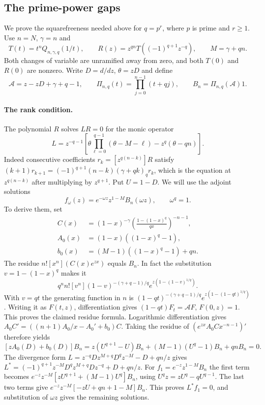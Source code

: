 \subsection{The prime-power gaps}

We prove the squarefreeness needed above for \(q=p^r\),
where \(p\) is prime and \(r\ge1\). Use \(n=N\), \(\gamma=n\)
and
\[
 T(t)=t^n Q_{n,\gamma,q}(1/t),\qquad
 R(z)=z^{qn}T((-1)^{q+1}z^{-q}),\qquad M=\gamma+qn.
\]
Both changes of variable are unramified away from zero, and both
\(T(0)\) and \(R(0)\) are nonzero. Write \(D=d/dz\), \(\theta=zD\)
and define
\[
 \mathcal A=z-zD+\gamma+q-1,\qquad
 \Pi_{n,q}(t)=\prod_{j=0}^{n-1}(t+qj),\qquad
 B_n=\Pi_{n,q}(\mathcal A)1 .
\]

\paragraph{The rank condition.}
The polynomial \(R\) solves \(LR=0\) for the monic operator
\[
 L=z^{-q-1}\left[
 \theta\prod_{\ell=0}^{q-1}(\theta-M-\ell)-z^q(\theta-qn)\right].
\]
Indeed consecutive coefficients \(r_k=[z^{q(n-k)}]R\) satisfy
\((k+1)r_{k+1}=(-1)^{q+1}(n-k)(\gamma+qk)_q r_k\),
which is the equation at \(z^{q(n-k)}\) after multiplying by
\(z^{q+1}\). Put \(U=1-D\). We will use the adjoint solutions
\[
 f_\omega(z)=e^{-\omega z}z^{1-M}B_n(\omega z),
 \qquad \omega^q=1.
\]
To derive them, set
\[
 \begin{aligned}
 C(x)&=(1-x)^{-\gamma}
       \left(\frac{1-(1-x)^q}{qx}\right)^{-n-1},\\
 A_0(x)&=(1-x)((1-x)^q-1),\\
 b_0(x)&=(M-1)((1-x)^q-1)+qn.
 \end{aligned}
\]
The residue \(n![x^n](C(x)e^{zx})\) equals \(B_n\).
In fact the substitution \(v=1-(1-x)^q\) makes it
\[
 q^n n![v^n](1-v)^{-(\gamma+q-1)/q}
                  e^{z(1-(1-v)^{1/q})}.
\]
With \(v=qt\) the generating function in \(n\) is
\((1-qt)^{-(\gamma+q-1)/q}e^{z(1-(1-qt)^{1/q})}\).
Writing it as \(F(t,z)\), differentiation gives
\((1-qt)F_t=\mathcal A F\), \(F(0,z)=1\). This proves the
claimed residue formula. Logarithmic differentiation gives
\(A_0 C'=((n+1)A_0/x-A_0'+b_0)C\). Taking the residue of
\((e^{zx}A_0 C x^{-n-1})'\) therefore yields
\[
 [zA_0(D)+b_0(D)]B_n
 =z(U^{q+1}-U)B_n+(M-1)(U^q-1)B_n+qnB_n=0.
\]
The divergence form \(L=z^{-q}D z^{M+q}D^q z^{-M}-D+qn/z\)
gives \(L^*=(-1)^{q+1}z^{-M}D^q z^{M+q}D z^{-q}+D+qn/z\).
For \(f_1=e^{-z}z^{1-M}B_n\) the first term becomes
\(e^{-z}z^{-M}[zU^{q+1}+(M-1)U^q]B_n\), using
\(U^qz=zU^q-qU^{q-1}\). The last two terms give
\(e^{-z}z^{-M}[-zU+qn+1-M]B_n\).
This proves \(L^*f_1=0\), and substitution of \(\omega z\)
gives the remaining solutions.

